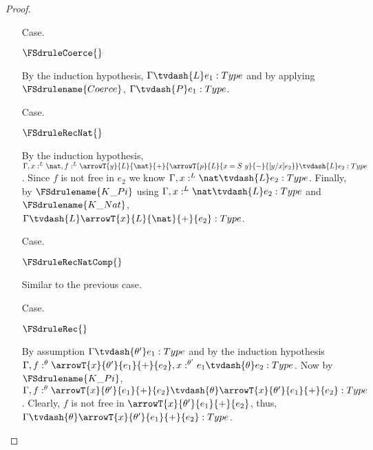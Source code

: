 \begin{proof}
\begin{itemize}
  \item[Case.] \ \\
    \begin{center}
      $\FSdruleCoerce{}$
    \end{center}
    By the induction hypothesis, $\Gamma \tvdash{L} e_1:Type$ and by applying 
    $\FSdrulename{Coerce}$, $\Gamma \tvdash{P} e_1:Type$.

  \item[Case.] \ \\
    \begin{center}
      $\FSdruleRecNat{}$
    \end{center}
    By the induction hypothesis, 
    $\Gamma, x:^L \nat,
    f:^L \arrowT{y}{L}{\nat}{+}{\arrowT{p}{L}{x=S\ y}{-}{[y/x]e_2}} \tvdash{L} e_2:Type$.  Since
    $f$ is not free in $e_2$ we know $\Gamma, x:^L \nat \tvdash{L} e_2:Type$.  Finally,
    by $\FSdrulename{K\_Pi}$ using $\Gamma, x:^L \nat \tvdash{L} e_2:Type$ and
    $\FSdrulename{K\_Nat}$, $\Gamma \tvdash{L} \arrowT{x}{L}{\nat}{+}{e_2}:Type$.

  \item[Case.] \ \\
    \begin{center}
      $\FSdruleRecNatComp{}$
    \end{center}
    Similar to the previous case.

  \item[Case.] \ \\
    \begin{center}
      $\FSdruleRec{}$
    \end{center}
    By assumption $\Gamma \tvdash{\theta'} e_1:Type$ and by the induction hypothesis
    $\Gamma, f:^\theta \arrowT{x}{\theta'}{e_1}{+}{e_2},x:^{\theta'} e_1 \tvdash{\theta} e_2:Type$.
    Now by $\FSdrulename{K\_Pi}$, $\Gamma, f:^\theta \arrowT{x}{\theta'}{e_1}{+}{e_2} 
    \tvdash{\theta} \arrowT{x}{\theta'}{e_1}{+}{e_2}:Type$. Clearly, $f$ is not free in
    $\arrowT{x}{\theta'}{e_1}{+}{e_2}$, thus, 
    $\Gamma \tvdash{\theta} \arrowT{x}{\theta'}{e_1}{+}{e_2}:Type$.

  \end{itemize}
\end{proof}

